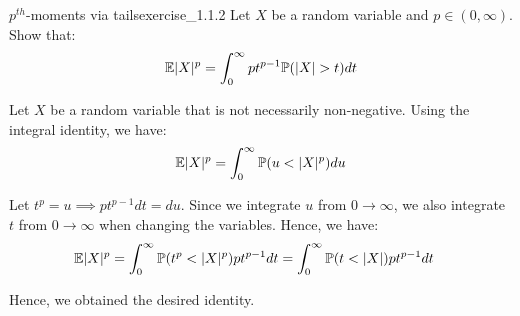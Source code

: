\begin{exercise}{$p^{th}$-moments via tails}{exercise_1.1.2}
    Let $X$ be a random variable and $p\in(0,\infty)$. Show that:
    \begin{align}
        \mathbb{E}|X|^p = \int_0^\infty pt^{p-1}\mathbb{P}(|X| > t)dt
    \end{align}
\end{exercise}

\begin{solution*}
    Let $X$ be a random variable that is not necessarily non-negative. Using the integral identity, we have:
    \begin{align*}
        \E|X|^p = \int_0^\infty \Pm(u<|X|^p)du
    \end{align*}

    \noindent Let $t^p = u \implies p t^{p-1}dt = du$. Since we integrate $u$ from $0\to\infty$, we also integrate $t$ from $0\to\infty$ when changing the variables. Hence, we have:
    \begin{align*}
        \mathbb{E}|X|^p &= \int_0^\infty \mathbb{P}(t^p < |X|^p)pt^{p-1}dt = \int_0^\infty \mathbb{P}(t < |X|)pt^{p-1}dt
    \end{align*}

    \noindent Hence, we obtained the desired identity.
\end{solution*}
